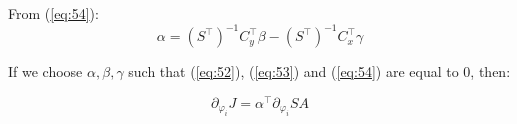 \noindent From (\ref{eq:54}): 
\begin{equation} \label{eq:58} 
\alpha =  \left(S^{\top}\right)^{-1} C_y^{\top} \beta - \left(S^{\top}\right)^{-1} C_x^{\top} \gamma 
\end{equation}

\noindent If we choose $\alpha, \beta, \gamma$ such that  (\ref{eq:52}), (\ref{eq:53}) and (\ref{eq:54}) are equal to $0$, then: 

\begin{equation} \label{eq:59} 
\partial_{\varphi_i} J = \alpha^{\top} \partial_{\varphi_i} S A 
\end{equation}

